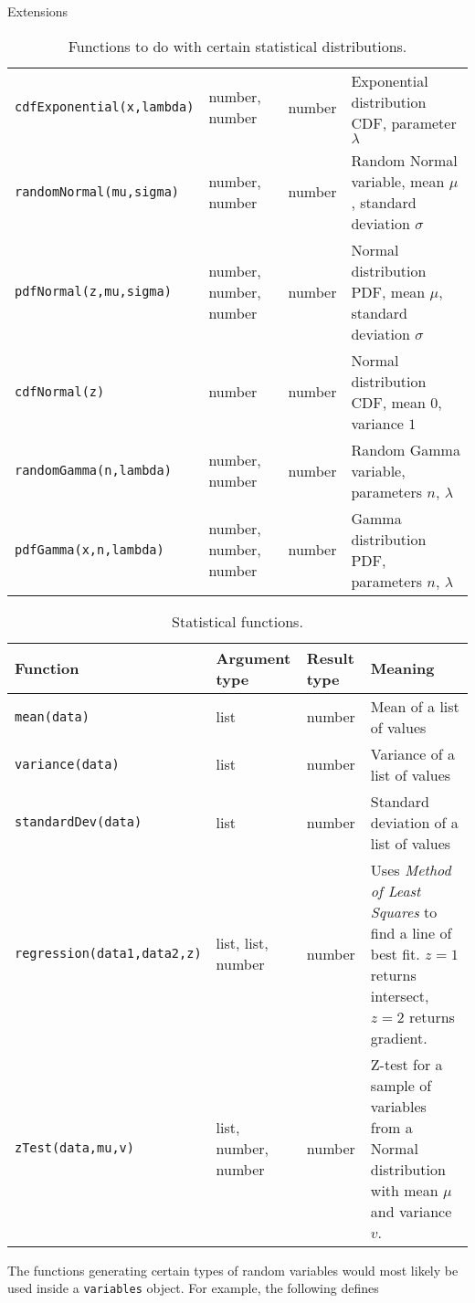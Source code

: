 \begin{chapter}{\label{cha:extensions}Extensions}
\begin{sidewaystable}[ht]
\begin{tabular}{lllp{20em}}
      \verb"cdfExponential(x,lambda)" & number, number & number & Exponential distribution CDF, parameter $\lambda$ \\
      \verb"randomNormal(mu,sigma)" & number, number & number & Random Normal variable, mean $\mu$, standard deviation $\sigma$ \\
      \verb"pdfNormal(z,mu,sigma)" & number, number, number & number & Normal distribution PDF, mean $\mu$, standard deviation $\sigma$ \\
  		\verb"cdfNormal(z)" & number & number & Normal distribution CDF, mean $0$, variance $1$ \\
      \verb"randomGamma(n,lambda)" & number, number & number & Random Gamma variable, parameters $n$, $\lambda$ \\
      \verb"pdfGamma(x,n,lambda)" & number, number, number & number & Gamma distribution PDF, parameters $n$, $\lambda$ \\
      \hline\hline
  	\end{tabular}
  	\caption{\label{tab:statsfunctions1}
  		Functions to do with certain statistical distributions.
  	}
  \end{sidewaystable}
  \begin{sidewaystable}[ht]
  	\centering
  	\begin{tabular}{lllp{20em}}
  		\hline
  		Function & Argument type & Result type & Meaning \\
  		\hline
      \verb"mean(data)"	& list & number	& Mean of a list of values \\
      \verb"variance(data)" & list & number & Variance of a list of values \\
      \verb"standardDev(data)" & list & number & Standard deviation of a list of values \\
      \verb"regression(data1,data2,z)" & list, list, number & number & Uses \emph{Method of Least Squares} to find a line of best fit. 
      $z = 1$ returns intersect, $z = 2$ returns gradient. \\ 
      \verb"zTest(data,mu,v)" & list, number, number & number & Z-test for a sample of variables from a Normal distribution with mean $\mu$ and variance $v$.\\
      \hline\hline
  	\end{tabular}
  	\caption{\label{tab:statsfunctions2}
  		Statistical functions.
  	}
  \end{sidewaystable}
  The functions generating certain types of random variables would most likely
  be used inside a \verb"variables" object. For example, the following defines

\end{chapter}
